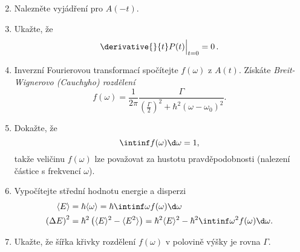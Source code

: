 \begin{enumerate}
\setcounter{enumi}{1}
\item 
    Nalezněte vyjádření pro $A(-t)$.

\item
    Ukažte, že
    \begin{equation}
        \derivative{}{t}P(t)\Big|_{t=0}=0\,.
    \end{equation}

\item 
    Inverzní Fourierovou transformací spočítejte $f(\omega)$ z $A(t)$. 
    Získáte \emph{Breit-Wignerovo (Cauchyho) rozdělení}
    \begin{equation}
        f(\omega)=\frac{1}{2\pi}\frac{\Gamma}{\left(\frac{\Gamma}{2}\right)^{2}+\hbar^{2}\left(\omega-\omega_{0}\right)^{2}}.
    \end{equation}

\item 
    Dokažte, že
    \begin{equation}
        \intinf f(\omega)\d\omega=1,
    \end{equation}
    takže veličinu $f(\omega)$ lze považovat za hustotu pravděpodobnosti (nalezení částice s frekvencí $\omega$).

\item 
    Vypočítejte střední hodnotu energie a disperzi
	\begin{subequations}
		\begin{align}
			\langle E\rangle&=\hbar\langle\omega\rangle=\hbar\intinf\omega f(\omega)\d\omega\\
			\left(\Delta E\right)^{2}&=\hbar^{2}\left(\langle E\rangle^{2}-\langle E^{2}\rangle\right)=\hbar^{2}\langle E\rangle^{2}-\hbar^{2}\intinf\omega^{2} f(\omega)\d\omega.
		\end{align}
	\end{subequations}

\item 
    Ukažte, že šířka křivky rozdělení $f(\omega)$ v polovině výšky je rovna $\Gamma$.
\end{enumerate}

